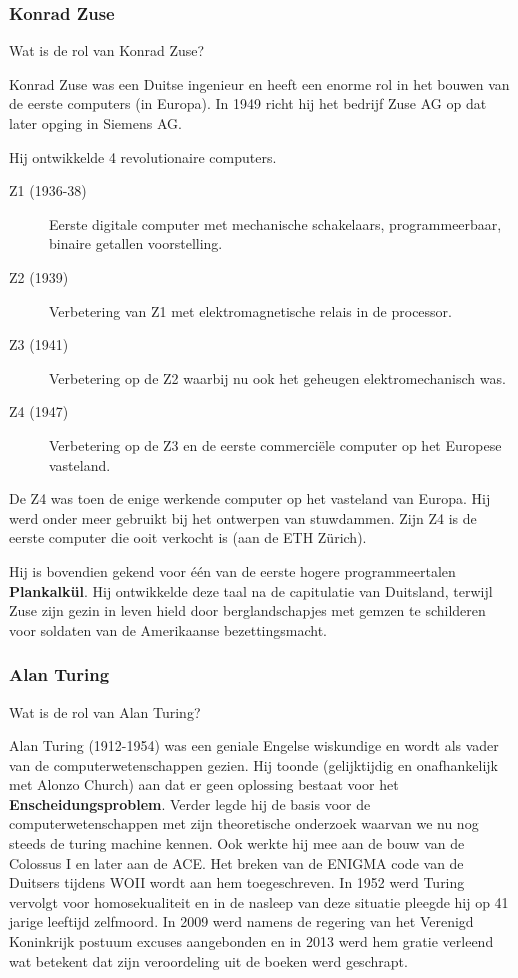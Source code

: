 \documentclass[../main.tex]{subfiles}
\begin{document}
\subsubsection{Konrad Zuse}
\begin{question}
Wat is de rol van Konrad Zuse?
\end{question}
\begin{solution}
Konrad Zuse was een Duitse ingenieur en heeft een enorme rol in het bouwen van de eerste computers (in Europa).
In 1949 richt hij het bedrijf Zuse AG op dat later opging in Siemens AG.

Hij ontwikkelde 4 revolutionaire computers.
\begin{description}
		\item[Z1 (1936-38)] Eerste digitale computer met mechanische schakelaars, programmeerbaar, binaire getallen voorstelling.
		\item[Z2 (1939)] Verbetering van Z1 met elektromagnetische relais in de processor.
		\item[Z3 (1941)] Verbetering op de Z2 waarbij nu ook het geheugen elektromechanisch was.
		\item[Z4 (1947)] Verbetering op de Z3 en de eerste commerci\"ele computer op het Europese vasteland.
\end{description}
De Z4 was toen de enige werkende computer op het vasteland van Europa. Hij werd onder meer gebruikt bij het ontwerpen van stuwdammen. Zijn Z4 is de eerste computer die ooit verkocht is (aan de ETH Zürich).

Hij is bovendien gekend voor \'e\'en van de eerste hogere programmeertalen \textbf{Plankalk\"ul}. Hij ontwikkelde deze taal na de capitulatie van Duitsland, terwijl Zuse zijn gezin in leven hield door berglandschapjes met gemzen te schilderen voor soldaten van de Amerikaanse bezettingsmacht.
\end{solution}

\subsubsection{Alan Turing}
\begin{question}
Wat is de rol van Alan Turing?
\end{question}
\begin{solution}
Alan Turing (1912-1954) was een geniale Engelse wiskundige en wordt als vader van de computerwetenschappen gezien.
Hij toonde (gelijktijdig en onafhankelijk met Alonzo Church) aan dat er geen oplossing bestaat voor het \textbf{Enscheidungsproblem}.
Verder legde hij de basis voor de computerwetenschappen met zijn theoretische onderzoek waarvan we nu nog steeds de turing machine kennen.
Ook werkte hij mee aan de bouw van de Colossus I en later aan de ACE.
Het breken van de ENIGMA code van de Duitsers tijdens WOII wordt aan hem toegeschreven.
In 1952 werd Turing vervolgt voor homosekualiteit en in de nasleep van deze situatie pleegde hij op 41 jarige leeftijd zelfmoord. In 2009 werd namens de regering van het Verenigd Koninkrijk postuum excuses aangebonden en in 2013 werd hem gratie verleend wat betekent dat zijn veroordeling uit de boeken werd geschrapt.
\end{solution}
\end{document}
